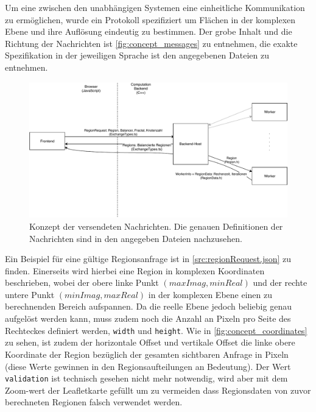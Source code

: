 Um eine zwischen den unabhängigen Systemen eine einheitliche Kommunikation zu ermöglichen,
wurde ein Protokoll spezifiziert um Flächen in der komplexen Ebene und ihre Auflösung eindeutig zu bestimmen.
Der grobe Inhalt und die Richtung der Nachrichten ist \autoref{fig:concept_messages} zu entnehmen,
die exakte Spezifikation in der jeweiligen Sprache ist den angegebenen Dateien zu entnehmen.

\begin{figure}
	\includegraphics[width=0.9\linewidth]{img/Implementierung/Nachrichtenuebersicht.pdf}
	\caption{Konzept der versendeten Nachrichten. Die genauen Definitionen der Nachrichten sind in den angegeben Dateien nachzusehen.}
	\label{fig:concept_messages}
\end{figure}


Ein Beispiel für eine gültige Regionsanfrage ist in \autoref{src:regionRequest.json} zu finden.
Einerseits wird hierbei eine Region in komplexen Koordinaten beschrieben, wobei der obere linke Punkt $(maxImag, minReal)$
und der rechte untere Punkt $(minImag, maxReal)$ in der komplexen Ebene einen zu berechnenden Bereich aufspannen.
Da die reelle Ebene jedoch beliebig genau aufgelöst werden kann, muss zudem noch die Anzahl an Pixeln
pro Seite des Rechteckes definiert werden, \verb|width| und \verb|height|.
Wie in \autoref{fig:concept_coordinates} zu sehen, ist zudem der horizontale Offset und vertikale Offset
die linke obere Koordinate der Region bezüglich der gesamten sichtbaren Anfrage in Pixeln (diese Werte
gewinnen in den Regionsaufteilungen an Bedeutung).
Der Wert \verb|validation| ist technisch gesehen nicht mehr notwendig, wird aber mit dem Zoom-wert der Leafletkarte gefüllt
um zu vermeiden dass Regionsdaten von zuvor berechneten Regionen falsch verwendet werden.

